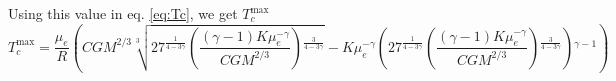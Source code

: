 \documentclass{revtex4-2}
\begin{document}
Using this value in eq. \eqref{eq:Tc}, we get $T_c^{\text{max}}$
\begin{equation}
  \label{eq:Tc-max}
  T_c^{\text{max}} = \frac{\mu _e}{R} \left(C G M^{2/3} \sqrt[3]{27^{\frac{1}{4-3 \gamma }}
   \left(\frac{(\gamma -1) K \mu _e^{-\gamma }}{C G
   M^{2/3}}\right){}^{\frac{3}{4-3 \gamma }}}-K \mu _e^{-\gamma }
   \left(27^{\frac{1}{4-3 \gamma }} \left(\frac{(\gamma -1) K \mu _e^{-\gamma }}{C
   G M^{2/3}}\right){}^{\frac{3}{4-3 \gamma }}\right){}^{\gamma -1}\right)
\end{equation}
\end{document}
